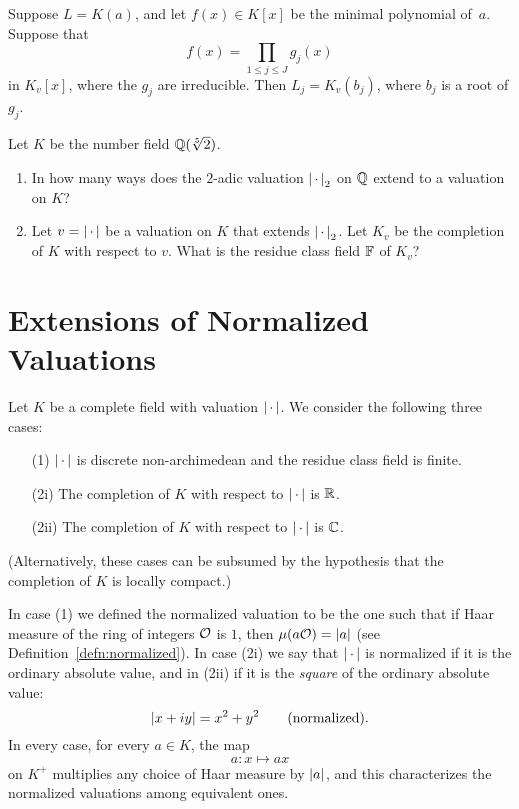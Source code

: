 \begin{corollary}
Suppose $L=K(a)$, and let $f(x)\in K[x]$ be the minimal polynomial of~$a$. 
Suppose that 
$$
f(x) = \prod_{1\leq j\leq J} g_j(x)
$$
in $K_v[x]$, where the $g_j$ are irreducible.  Then $L_j = K_v(b_j)$, where
$b_j$ is a root of $g_j$.
\end{corollary}

\begin{exercise}\label{ex:extval1}
Let $K$ be the number field $\mathbb{Q}(\sqrt[5]{2})$.
\begin{enumerate}
\item In how many ways does the $2$-adic valuation $\left|\,\cdot\,\right|_2$ on $\mathbb{Q}$
extend to a valuation on $K$?
\item Let $v=\left|\,\cdot\,\right|$ be a valuation on $K$ that extends $\left|\,\cdot\,\right|_2$.
Let $K_v$ be the completion of $K$ with respect to $v$.
What is the residue class field $\mathbb{F}$ of $K_v$?
\end{enumerate}
\end{exercise}

\section{Extensions of Normalized Valuations}
Let $K$ be a complete field with valuation $\left|\,\cdot\,\right|$.  
We consider the following three cases:
\begin{itemize}
\item[(1)] $\left|\,\cdot\,\right|$ is discrete non-archimedean and the 
residue class field is finite.
\item[(2i)] The completion of $K$ with respect to $\left|\,\cdot\,\right|$ is $\mathbb{R}$.
\item[(2ii)] The completion of $K$ with respect to $\left|\,\cdot\,\right|$ is $\mathbb{C}$.
\end{itemize}
(Alternatively, these cases can be subsumed by the hypothesis that
the completion of $K$ is locally compact.)

In case (1) we defined the normalized valuation to 
be the one such that if Haar measure of the ring of integers $\mathcal{O}$ is $1$,
then $\mu(a\mathcal{O}) = \left|a\right|$ (see Definition~\ref{defn:normalized}).
In case (2i) we say that $\left|\,\cdot\,\right|$ is normalized if it is the ordinary
absolute value, and in (2ii) if it is the {\em square} of the ordinary
absolute value:
$$\left|x+iy\right| = x^2 + y^2 \qquad \text{(normalized)}.$$
In every case, for every $a\in K$,  the map 
$$
   a: x \mapsto a x
$$
on $K^+$ multiplies any choice of Haar measure by $\left|a\right|$, and this characterizes
the normalized valuations among equivalent ones. 

